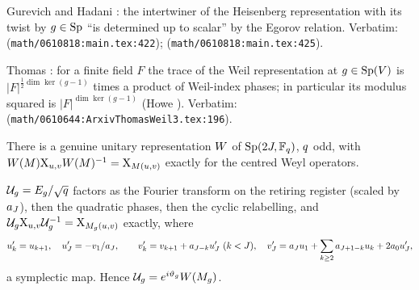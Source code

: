 \begin{citedfact}
\label{cit:weil-egorov-uniqueness}
Gurevich and Hadani \cite{gurevich2007geometric}: the intertwiner of the Heisenberg
representation with its twist by $g\in\mathrm{Sp}$ ``is determined up to scalar'' by the Egorov
relation.
Verbatim: \texttt{} (\texttt{math/0610818:main.tex:422}); \texttt{} (\texttt{math/0610818:main.tex:425}).
\end{citedfact}

\begin{citedfact}
\label{cit:weil-character-formula}
Thomas \cite{thomas2008character}: for a finite field $F$ the trace of the Weil
representation at $g\in\mathrm{Sp}(V)$ is $|F|^{\frac12\dim\ker(g-1)}$ times a product of Weil-index
phases; in particular its modulus squared is $|F|^{\dim\ker(g-1)}$ (Howe
\cite{howe1973character}).
Verbatim: \texttt{} (\texttt{math/0610644:ArxivThomasWeil3.tex:196}).
\end{citedfact}

\begin{assumption}
\label{asm:weil-implementer-exact}
There is a genuine unitary representation $W$ of $\mathrm{Sp}(2J,\mathbb F_q)$, $q$ odd,
with $W(M)\mathrm{X}_{u,v}W(M)^{-1} = \mathrm{X}_{M(u,v)}$ exactly for the centred Weyl
operators.
\end{assumption}

\begin{theorem}
\label{thm:as-symplectic-map}
$\mathcal U_{g} = E_g/\sqrt{q}$ factors as the Fourier transform on the retiring register
(scaled by $a_{J}$), then the quadratic phases, then the cyclic relabelling, and
$\mathcal U_{g}\mathrm{X}_{u,v}\mathcal U_{g}^{-1} = \mathrm{X}_{M_{g}(u,v)}$ exactly, where
\[
  u'_k = u_{k+1},\quad u'_{J} = -v_1/a_{J},\qquad
  v'_k = v_{k+1} + a_{J-k}u'_{J}\ (k<J),\quad
  v'_{J} = a_{J}u_1 + \sum_{k\ge2}a_{J+1-k}u_k + 2a_0u'_{J},
\]
a symplectic map. Hence $\mathcal U_{g} = e^{i\vartheta_{g}}W(M_{g})$.
\end{theorem}

